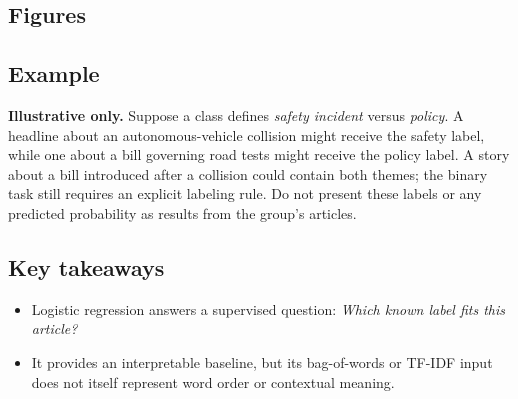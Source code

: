 \documentclass[11pt]{article}
\begin{document}
\subsection*{Figures}
\begin{center}
\end{center}

\subsection*{Example}
\textbf{Illustrative only.} Suppose a class defines \emph{safety incident} versus \emph{policy}. A headline about an autonomous-vehicle collision might receive the safety label, while one about a bill governing road tests might receive the policy label. A story about a bill introduced after a collision could contain both themes; the binary task still requires an explicit labeling rule. Do not present these labels or any predicted probability as results from the group's articles.

\subsection*{Key takeaways}
\begin{itemize}
  \item Logistic regression answers a supervised question: \emph{Which known label fits this article?}
  \item It provides an interpretable baseline, but its bag-of-words or TF-IDF input does not itself represent word order or contextual meaning.
\end{itemize}
\end{document}

